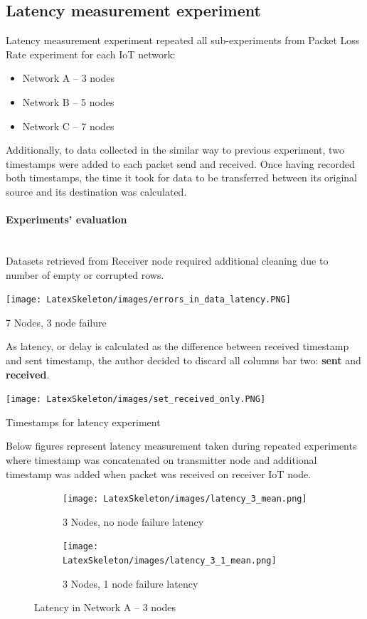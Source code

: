 \documentclass[oneside,12pt]{book}
\newcommand{\myparagraph}[1]{\paragraph{#1}\mbox{}\\}
\begin{document}
\subsection{Latency measurement experiment}
Latency measurement experiment repeated all sub-experiments from Packet Loss Rate experiment for each IoT network:
\begin{itemize}
  \item Network A – 3 nodes
  \item Network B – 5 nodes
  \item Network C – 7 nodes
\end{itemize}
\noindent Additionally, to data collected in the similar way to previous experiment, two timestamps were added to each packet send and received. Once having recorded both timestamps, the time it took for data to be transferred between its original source and its destination was calculated. 
\myparagraph{Experiments’ evaluation}
Datasets retrieved from Receiver node required additional cleaning due to number of empty or corrupted rows. 
\begin{table}[H]
  \centering
  \label{tbl:Errors in dataset }
  \texttt{[image: LatexSkeleton/images/errors\_in\_data\_latency.PNG]}
  \caption{7 Nodes, 3 node failure}
\end{table}
\noindent As latency, or delay is calculated as the difference between received timestamp and sent timestamp, the author decided to discard all columns bar two: \textbf{sent} and \textbf{received}.
\begin{table}[H]
  \centering
  \label{tbl:Timestamps for latency experiment}
  \texttt{[image: LatexSkeleton/images/set\_received\_only.PNG]}
  \caption{Timestamps for latency experiment}
\end{table}
\noindent Below figures represent latency measurement taken during repeated experiments where timestamp was concatenated on transmitter node and additional timestamp was added when packet was received on receiver IoT node.
\begin{figure}[H]
\centering
\begin{subfigure}{.5\textwidth}
  \centering
  \texttt{[image: LatexSkeleton/images/latency\_3\_mean.png]}
  \caption{3 Nodes, no node failure latency}
  \label{fig:3 Nodes, 1 node failure latency}
\end{subfigure}%
\begin{subfigure}{.5\textwidth}
  \centering
  \texttt{[image: LatexSkeleton/images/latency\_3\_1\_mean.png]}
  \caption{3 Nodes, 1 node failure latency}
  \label{fig:3 Nodes, 1 node failure latency}
\end{subfigure}
\caption{Latency in Network A – 3 nodes}
\label{fig:test}
\end{figure}
\end{document}
